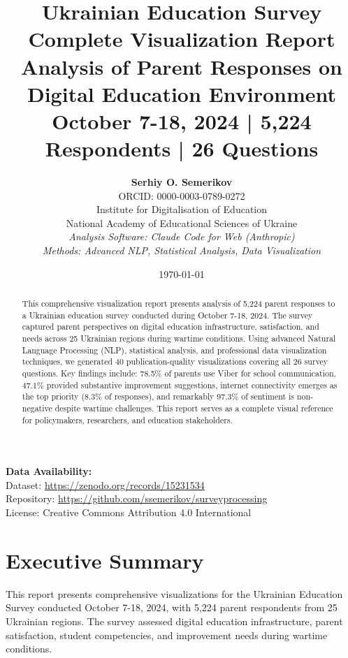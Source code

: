 \documentclass[11pt,a4paper]{article}
\title{\Huge\textbf{Ukrainian Education Survey\\Complete Visualization Report}\\[0.5cm]
       \Large Analysis of Parent Responses on Digital Education Environment\\[0.3cm]
       \large October 7-18, 2024 | 5,224 Respondents | 26 Questions}
\author{\textbf{Serhiy O. Semerikov}\\
        ORCID: 0000-0003-0789-0272\\[0.3cm]
        \small Institute for Digitalisation of Education\\
        \small National Academy of Educational Sciences of Ukraine\\[0.5cm]
        \small\textit{Analysis Software: Claude Code for Web (Anthropic)}\\
        \small\textit{Methods: Advanced NLP, Statistical Analysis, Data Visualization}}
\date{\today}
\begin{document}
\maketitle
\thispagestyle{empty}

\vfill

\begin{abstract}
\noindent This comprehensive visualization report presents analysis of 5,224 parent responses to a Ukrainian education survey conducted during October 7-18, 2024. The survey captured parent perspectives on digital education infrastructure, satisfaction, and needs across 25 Ukrainian regions during wartime conditions. Using advanced Natural Language Processing (NLP), statistical analysis, and professional data visualization techniques, we generated 40 publication-quality visualizations covering all 26 survey questions. Key findings include: 78.5\% of parents use Viber for school communication, 47.1\% provided substantive improvement suggestions, internet connectivity emerges as the top priority (8.3\% of responses), and remarkably 97.3\% of sentiment is non-negative despite wartime challenges. This report serves as a complete visual reference for policymakers, researchers, and education stakeholders.
\end{abstract}

\vfill

\begin{center}
\colorbox{ukraineyellow!30}{\parbox{0.9\textwidth}{
\textbf{Data Availability:} \\
Dataset: \url{https://zenodo.org/records/15231534} \\
Repository: \url{https://github.com/ssemerikov/surveyprocessing} \\
License: Creative Commons Attribution 4.0 International
}}
\end{center}

\newpage

\tableofcontents
\newpage

\section{Executive Summary}

This report presents comprehensive visualizations for the Ukrainian Education Survey conducted October 7-18, 2024, with 5,224 parent respondents from 25 Ukrainian regions. The survey assessed digital education infrastructure, parent satisfaction, student competencies, and improvement needs during wartime conditions.
\end{document}
